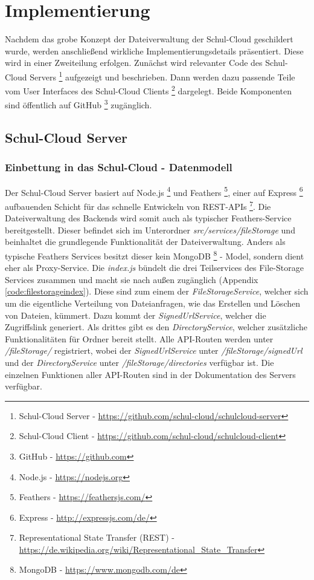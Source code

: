 \section{Implementierung}
\label{sec:implementation}

Nachdem das grobe Konzept der Dateiverwaltung der Schul-Cloud geschildert wurde, werden anschließend wirkliche Implementierungsdetails präsentiert. Diese wird in einer Zweiteilung erfolgen. Zunächst wird relevanter Code des Schul-Cloud Servers \footnote{Schul-Cloud Server - \url{https://github.com/schul-cloud/schulcloud-server}} aufgezeigt und beschrieben. Dann werden dazu passende Teile vom User Interfaces des Schul-Cloud Clients \footnote{Schul-Cloud Client - \url{https://github.com/schul-cloud/schulcloud-client}} dargelegt. Beide Komponenten sind öffentlich auf GitHub \footnote{GitHub - \url{https://github.com}} zugänglich.

\subsection{Schul-Cloud Server}
\subsubsection{Einbettung in das Schul-Cloud - Datenmodell}

Der Schul-Cloud Server basiert auf Node.js \footnote{Node.js - \url{https://nodejs.org}} und Feathers \footnote{Feathers - \url{https://feathersjs.com/}}, einer auf Express \footnote{Express - \url{http://expressjs.com/de/}} aufbauenden Schicht für das schnelle Entwickeln von REST-APIs \footnote{Representational State Transfer (REST) - \url{https://de.wikipedia.org/wiki/Representational_State_Transfer}}. Die Dateiverwaltung des Backends wird somit auch als typischer Feathers-Service bereitgestellt. Dieser befindet sich im Unterordner \textit{src/services/fileStorage} und beinhaltet die grundlegende Funktionalität der Dateiverwaltung. Anders als typische Feathers Services besitzt dieser kein MongoDB \footnote{MongoDB - \url{https://www.mongodb.com/de}} - Model, sondern dient eher als Proxy-Service. Die \textit{index.js} bündelt die drei Teilservices des File-Storage Services zusammen und macht sie nach außen zugänglich (Appendix \ref{code:filestorageindex}). Diese sind zum einem der \textit{FileStorageService}, welcher sich um die eigentliche Verteilung von Dateianfragen, wie das Erstellen und Löschen von Dateien, kümmert. Dazu kommt der \textit{SignedUrlService}, welcher die Zugriffslink generiert. Als drittes gibt es den \textit{DirectoryService}, welcher zusätzliche Funktionalitäten für Ordner bereit stellt. Alle API-Routen werden unter \textit{/fileStorage/} registriert, wobei der \textit{SignedUrlService} unter \textit{/fileStorage/signedUrl} und der \textit{DirectoryService} unter \textit{/fileStorage/directories} verfügbar ist. Die einzelnen Funktionen aller API-Routen sind in der Dokumentation des Servers \cite{online:serverswagger} verfügbar. \\

